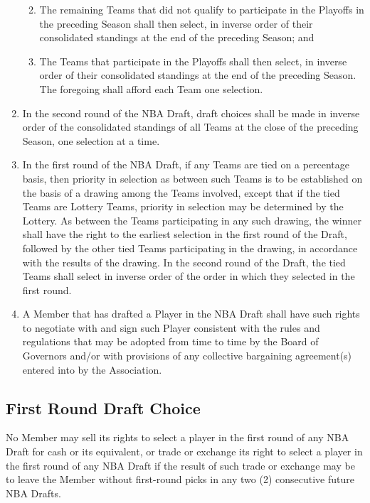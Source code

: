 \documentclass[]{book}
\providecommand{\tightlist}{%
  \setlength{\itemsep}{0pt}\setlength{\parskip}{0pt}}
\begin{document}
\begin{enumerate}
  \begin{enumerate}
  \def\labelenumii{(\roman{enumii})}
  \setcounter{enumii}{1}
  \tightlist
  \item
    The remaining Teams that did not qualify to participate in the Playoffs in the preceding Season shall then select, in inverse order of their consolidated standings at the end of the preceding Season; and
  \item
    The Teams that participate in the Playoffs shall then select, in inverse order of their consolidated standings at the end of the preceding Season. The foregoing shall afford each Team one selection.
  \end{enumerate}
\item
  In the second round of the NBA Draft, draft choices shall be made in inverse order of the consolidated standings of all Teams at the close of the preceding Season, one selection at a time.
\item
  In the first round of the NBA Draft, if any Teams are tied on a percentage basis, then priority in selection as between such Teams is to be established on the basis of a drawing among the Teams involved, except that if the tied Teams are Lottery Teams, priority in selection may be determined by the Lottery. As between the Teams participating in any such drawing, the winner shall have the right to the earliest selection in the first round of the Draft, followed by the other tied Teams participating in the drawing, in accordance with the results of the drawing. In the second round of the Draft, the tied Teams shall select in inverse order of the order in which they selected in the first round.
\item
  A Member that has drafted a Player in the NBA Draft shall have such rights to negotiate with and sign such Player consistent with the rules and regulations that may be adopted from time to time by the Board of Governors and/or with provisions of any collective bargaining agreement(s) entered into by the Association.
\end{enumerate}

\hypertarget{first-round-draft-choice}{%
\subsection{First Round Draft Choice}\label{first-round-draft-choice}}

No Member may sell its rights to select a player in the first round of any NBA Draft for cash or its equivalent, or trade or exchange its right to select a player in the first round of any NBA Draft if the result of such trade or exchange may be to leave the Member without first-round picks in any two (2) consecutive future NBA Drafts.
\end{document}
